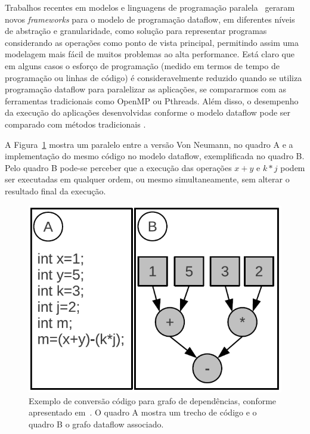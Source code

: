Trabalhos recentes em modelos e linguagens de programação paralela~\cite{trebuchetijhpsa,1473,1136512,Gupta:2011:DES:2155620.2155628,tbbflow,journals/pc/BosilcaBDHLD12,Giorgi2014} geraram novos \emph{frameworks} para o modelo de programação dataflow, em diferentes níveis de abstração e granularidade, como solução para representar programas considerando as operações como ponto de vista principal, permitindo assim uma modelagem mais fácil de muitos problemas ao alta performance.
Está claro que em alguns casos o esforço de programação (medido em termos de tempo de programação ou linhas de código) é consideravelmente reduzido quando se utiliza programação dataflow para paralelizar as aplicações, se compararmos com as ferramentas tradicionais como OpenMP ou Pthreads.
Além disso, o desempenho da execução do aplicações desenvolvidas conforme o modelo dataflow pode ser comparado com métodos tradicionais \cite{trebuchetijhpsa,lcswamca}.

A Figura~\ref{fig:dataflowExemplo} mostra um paralelo entre a versão Von Neumann, no quadro A e a implementação do mesmo código no modelo dataflow, exemplificada no quadro B.
Pelo quadro B pode-se perceber que a execução das operações $x + y$ e $k * j$ podem ser executadas em qualquer ordem, ou mesmo simultaneamente, sem alterar o resultado final da execução.

\begin{figure}[htpb]
    \centering
    \includegraphics[scale=0.6]{figuras/dataflow/dataflowExemplo.png}
    \caption{Exemplo de conversão código para grafo de dependências, conforme apresentado em~\cite{teseMarzulo}.
    O quadro A mostra um trecho de código e o quadro B o grafo dataflow associado.}
    \label{fig:dataflowExemplo}
\end{figure}

